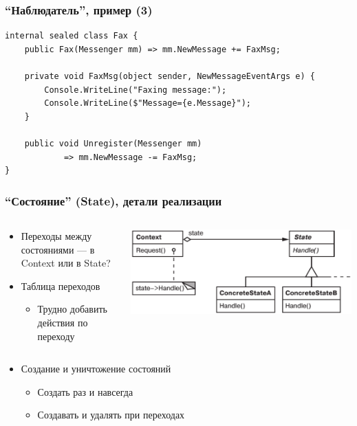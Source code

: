 \documentclass[xetex,mathserif,serif]{beamer}
\begin{document}
	\begin{frame}[fragile]
		\frametitle{``Наблюдатель'', пример (3)}
		\begin{itemize}
			\begin{verbatim}
internal sealed class Fax {
    public Fax(Messenger mm) => mm.NewMessage += FaxMsg;

    private void FaxMsg(object sender, NewMessageEventArgs e) {
        Console.WriteLine("Faxing message:");
        Console.WriteLine($"Message={e.Message}");
    }

    public void Unregister(Messenger mm) 
            => mm.NewMessage -= FaxMsg;
}
			\end{verbatim}
		\end{itemize}
\end{frame}

	\begin{frame}
		\frametitle{``Состояние'' (State), детали реализации}
		\begin{columns}
			\begin{column}{0.5\textwidth}
				\begin{itemize}
					\item Переходы между состояниями --- в Context или в State?
					\item Таблица переходов
					\begin{itemize}
						\item Трудно добавить действия по переходу
					\end{itemize}
				\end{itemize}
			\end{column}
			\begin{column}{0.5\textwidth}
				\begin{center}
					\includegraphics[width=\textwidth]{state.png}
				\end{center}
			\end{column}
		\end{columns}
		\begin{itemize}
			\item Создание и уничтожение состояний
			\begin{itemize}
				\item Создать раз и навсегда
				\item Создавать и удалять при переходах
			\end{itemize}
		\end{itemize}
	\end{frame}
\end{document}
